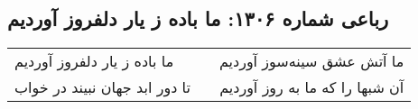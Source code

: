 \begin{center}
\section*{رباعی شماره ۱۳۰۶: ما باده ز یار دلفروز آوردیم}
\label{sec:1306}
\begin{longtable}{l p{0.5cm} r}
ما باده ز یار دلفروز آوردیم
&&
ما آتش عشق سینه‌سوز آوردیم
\\
تا دور ابد جهان نبیند در خواب
&&
آن شبها را که ما به روز آوردیم
\\
\end{longtable}
\end{center}
